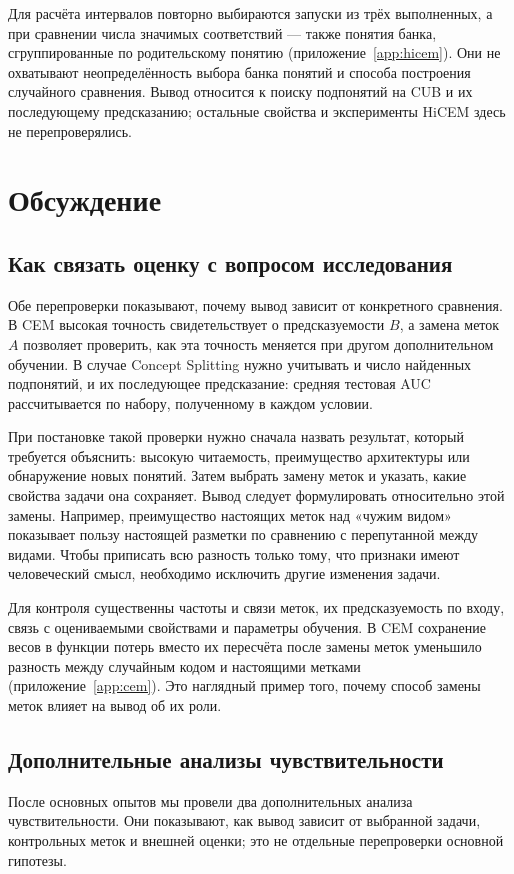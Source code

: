 \documentclass[10pt]{article}
\begin{document}
Для расчёта интервалов повторно выбираются запуски из трёх выполненных, а при сравнении числа значимых соответствий --- также понятия банка, сгруппированные по родительскому понятию (приложение~\ref{app:hicem}). Они не охватывают неопределённость выбора банка понятий и способа построения случайного сравнения. Вывод относится к поиску подпонятий на CUB и их последующему предсказанию; остальные свойства и эксперименты HiCEM здесь не перепроверялись.

\section{Обсуждение}\label{sec:discussion}
\subsection{Как связать оценку с вопросом исследования}
Обе перепроверки показывают, почему вывод зависит от конкретного сравнения. В CEM высокая точность свидетельствует о предсказуемости $B$, а замена меток $A$ позволяет проверить, как эта точность меняется при другом дополнительном обучении. В случае Concept Splitting нужно учитывать и число найденных подпонятий, и их последующее предсказание: средняя тестовая AUC рассчитывается по набору, полученному в каждом условии.

При постановке такой проверки нужно сначала назвать результат, который требуется объяснить: высокую читаемость, преимущество архитектуры или обнаружение новых понятий. Затем выбрать замену меток и указать, какие свойства задачи она сохраняет. Вывод следует формулировать относительно этой замены. Например, преимущество настоящих меток над «чужим видом» показывает пользу настоящей разметки по сравнению с перепутанной между видами. Чтобы приписать всю разность только тому, что признаки имеют человеческий смысл, необходимо исключить другие изменения задачи.

Для контроля существенны частоты и связи меток, их предсказуемость по входу, связь с оцениваемыми свойствами и параметры обучения. В CEM сохранение весов в функции потерь вместо их пересчёта после замены меток уменьшило разность между случайным кодом и настоящими метками (приложение~\ref{app:cem}). Это наглядный пример того, почему способ замены меток влияет на вывод об их роли.

\subsection{Дополнительные анализы чувствительности}
После основных опытов мы провели два дополнительных анализа чувствительности. Они показывают, как вывод зависит от выбранной задачи, контрольных меток и внешней оценки; это не отдельные перепроверки основной гипотезы.
\end{document}
